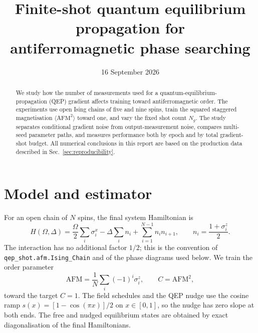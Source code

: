 \documentclass[11pt]{article}
\title{Finite-shot quantum equilibrium propagation for\\antiferromagnetic phase searching}
\author{}
\date{16 September 2026}
\begin{document}
\maketitle

\begin{abstract}
We study how the number of measurements used for a quantum-equilibrium-propagation
(QEP) gradient affects training toward antiferromagnetic order.  The experiments use
open Ising chains of five and nine spins, train the squared staggered magnetisation
$\langle\mathrm{AFM}^2\rangle$ toward one, and vary the fixed shot count $N_g$.
The study separates conditional gradient noise from output-measurement noise, compares
multi-seed parameter paths, and measures performance both by epoch and by total
gradient-shot budget.  All numerical conclusions in this report are based on the
production data described in Sec.~\ref{sec:reproducibility}.
\end{abstract}

\section{Model and estimator}
\label{sec:model}

For an open chain of $N$ spins, the final system Hamiltonian is
\begin{equation}
H(\Omega,\Delta)=\frac{\Omega}{2}\sum_i\sigma_i^x
-\Delta\sum_i n_i+\sum_{i=1}^{N-1} n_i n_{i+1},
\qquad n_i=\frac{1+\sigma_i^z}{2}.
\end{equation}
The interaction has no additional factor $1/2$; this is the convention of
\texttt{qep\_shot.afm.Ising\_Chain} and of the phase diagrams used below.  We train
the order parameter
\begin{equation}
\mathrm{AFM}=\frac{1}{N}\sum_i(-1)^i\sigma_i^z,
\qquad C=\mathrm{AFM}^2,
\end{equation}
toward the target $C=1$.  The field schedules and the QEP nudge use the cosine ramp
$s(x)=[1-\cos(\pi x)]/2$ on $x\in[0,1]$, so the nudge has zero slope at both ends.
The free and nudged equilibrium states are obtained by exact diagonalisation of the
final Hamiltonians.
\end{document}
